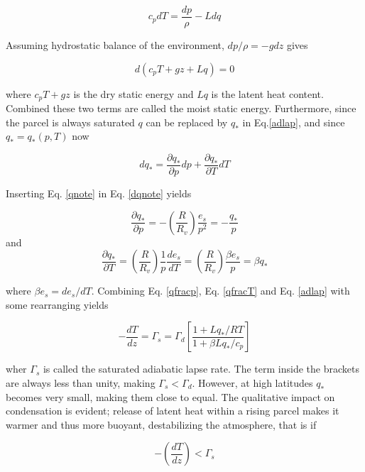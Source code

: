 \begin{equation}
    c_p dT = \frac{dp}{\rho}-L dq
    \label{adlap}
\end{equation}

Assuming hydrostatic balance of the environment, $dp/\rho = -gdz$ gives

\begin{equation}
    d(c_pT + gz + Lq) = 0
\end{equation}

where $c_pT+gz$ is the dry static energy and $Lq$ is the latent heat content. Combined these two terms are called the moist static energy. Furthermore, since the parcel is always saturated $q$ can be replaced by $q_*$ in Eq.\eqref{adlap}, and since $q_*=q_*(p,T)$ now

\begin{equation}
    dq_* = \frac{\partial q_*}{\partial p}dp + \frac{\partial q_*}{\partial T}dT
    \label{dqnote}
\end{equation}

Inserting Eq. \eqref{qnote} in Eq. \eqref{dqnote} yields 

\begin{equation}
        \frac{\partial q_*}{\partial p} = -(\frac{R}{R_v})\frac{e_s}{p^2} = -\frac{q_*}{p}
        \label{qfracp}
\end{equation}
and
\begin{equation}
            \frac{\partial q_*}{\partial T} = (\frac{R}{R_v})\frac{1}{p}\frac{de_s}{dT} = (\frac{R}{R_v})\frac{\beta e_s}{p} = \beta q_*
            \label{qfracT}
\end{equation}

where $\beta e_s = de_s/dT$. Combining Eq. \eqref{qfracp}, Eq. \eqref{qfracT} and Eq. \eqref{adlap} with some rearranging yields

\begin{equation}
    -\frac{dT}{dz} = \Gamma_s = \Gamma_d \left[\frac{1+Lq_*/RT}{1+\beta Lq_*/c_p} \right]
\end{equation}

wher $\Gamma_s$ is called the saturated adiabatic lapse rate. The term inside the brackets are always less than unity, making $\Gamma_s < \Gamma_d$. However, at high latitudes $q_*$ becomes very small, making them close to equal. The qualitative impact on condensation is evident; release of latent heat within a rising parcel makes it warmer and thus more buoyant, destabilizing the atmosphere, that is if

\begin{equation}
    -(\frac{dT}{dz}) < \Gamma_s
\end{equation}

